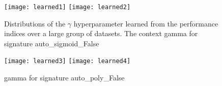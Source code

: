 \begin{figure}[h!]
	\centering
	\texttt{[image: learned1]}
	\texttt{[image: learned2]}
	\caption[Uninformative learned general priors]{Distributions of the $\gamma$ hyperparameter learned from the performance indices over
	a large group of datasets. The context gamma for signature auto\_sigmoid\_False} \label{img:learned1}
	\label{fig:learned_gamma1}
\end{figure}


\begin{figure}[h!]
	\centering
	\texttt{[image: learned3]}
	\texttt{[image: learned4]}
	\caption[Informative learned general priors]{gamma for signature auto\_poly\_False}
	\label{fig:learned_gamma2}
\end{figure}

